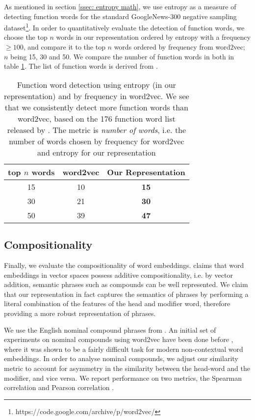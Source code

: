 \documentclass[11pt,a4paper]{article}
\begin{document}
As mentioned in section \ref{ssec: entropy math}, we use entropy as a measure of detecting function words for the standard GoogleNews-300 negative sampling dataset\footnote{https://code.google.com/archive/p/word2vec/}. In order to quantitatively evaluate the detection of function words, we choose the top $n$ words in our representation ordered by entropy with a frequency $\geq 100$, and compare it to the top $n$ words ordered by frequency from word2vec; $n$ being 15, 30 and 50. We compare the number of function words in both in table \ref{tab: function word eval}. The list of function words is derived from \citet{nation2016making}.

\begin{table}[]
    \centering
    {\small
    \begin{tabular}{c|cc}
        top $n$ words & \bf word2vec & \bf Our Representation  \\ \hline
        15  & 10 & \bf 15 \\
        30  & 21 & \bf 30 \\
        50  & 39 & \bf 47  \\
    \end{tabular}
    }
    \caption{Function word detection using entropy (in our representation) and by frequency in word2vec. We see that we consistently detect more function words than word2vec, based on the 176 function word list released by \citet{nation2016making}. The metric is \emph{number of words}, i.e. the number of words chosen by frequency for word2vec and entropy for our representation}
    \label{tab: function word eval}
\end{table}

\subsection{Compositionality}
\label{ssec: entailment}

Finally, we evaluate the compositionality of word embeddings. \citet{mikolov2013distributed} claims that word embeddings in vector spaces possess additive compositionality, i.e. by vector addition, semantic phrases such as compounds can be well represented. We claim that our representation in fact captures the semantics of phrases by performing a literal combination of the features of the head and modifier word, therefore providing a more robust representation of phrases.

We use the English nominal compound phrases from \citet{ramisch-etal-2016-naked}. An initial set of experiments on nominal compounds using word2vec have been done before \citep{cordeiro-etal-2016-predicting}, where it was shown to be a fairly difficult task for modern non-contextual word embeddings. In order to analyse nominal compounds, we adjust our similarity metric to account for asymmetry in the similarity between the head-word and the modifier, and vice versa. We report performance on two metrics, the Spearman correlation \citep{spearman1987proof} and Pearson correlation \citep{pearson1920notes}. 
\end{document}
